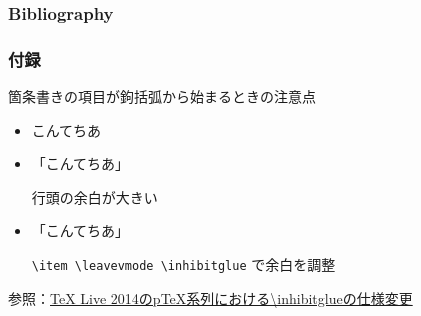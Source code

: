 \documentclass[12pt]{beamer}
\renewcommand\appendixname{付録}
\begin{document}
\begin{frame}
\frametitle{Bibliography}
\footnotesize


\end{frame}

\appendix
\begin{frame}
    \footnotesize
    \frametitle{\appendixname}
    箇条書きの項目が鉤括弧から始まるときの注意点
    \begin{itemize}
        \item こんてちあ
        \item 「こんてちあ」

            行頭の余白が大きい
        \item \leavevmode\inhibitglue 「こんてちあ」

            \texttt{\textbackslash item \textbackslash leavevmode \textbackslash inhibitglue} で余白を調整
    \end{itemize}

    \bigskip

    参照：\href{http://doratex.hatenablog.jp/entry/20140714/1405302796}{TeX Live 2014のpTeX系列における\textbackslash inhibitglueの仕様変更}
\end{frame}
\end{document}
